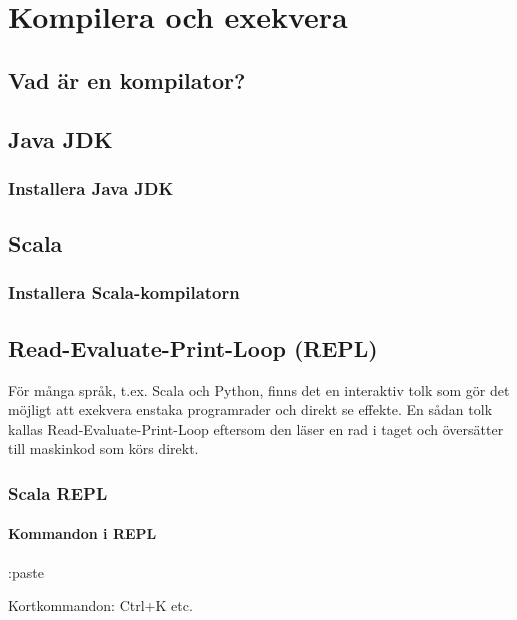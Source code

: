 
\chapter{Kompilera och exekvera}\label{appendix:compile}
\section{Vad är en kompilator?}
\section{Java JDK}
\subsection{Installera Java JDK}
\section{Scala}
\subsection{Installera Scala-kompilatorn}
\section{Read-Evaluate-Print-Loop (REPL)}
För många språk, t.ex. Scala och Python, finns det en interaktiv tolk som gör det möjligt att exekvera enstaka programrader och direkt se effekte. En sådan tolk kallas Read-Evaluate-Print-Loop eftersom den läser en rad i taget och översätter till maskinkod som körs direkt.    
\subsection{Scala REPL}
\subsubsection{Kommandon i REPL}
:paste

Kortkommandon: Ctrl+K etc.